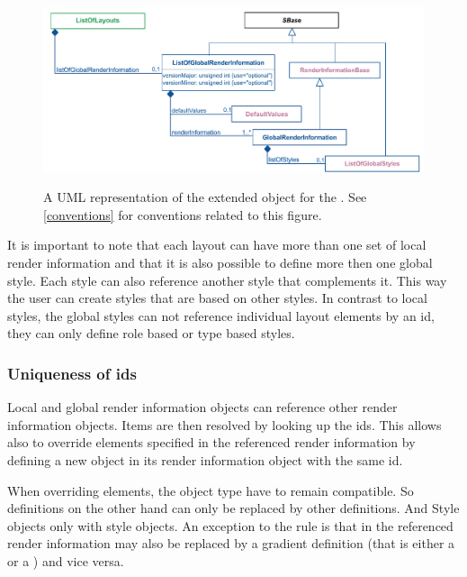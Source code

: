 \begin{figure}[!ht]
  \centering
  \includegraphics[width=\textwidth]{images/render-listoflayout-uml}\\
  \caption{A UML representation of the extended \ListOfLayouts object for the \RenderPackage.  See \ref{conventions} for conventions related to this figure. }
  \label{fig:lol_render_uml}
\end{figure}

It is important to note that each layout can have more than one 
set of local render information and that it is 
also possible to define more then one global style. Each style can also 
reference another style that complements it. This way the user can create 
styles that are based on other styles. In contrast to local styles, the global styles can not 
reference individual layout elements by an id, they can only define role based or 
type based styles.

\subsubsection{Uniqueness of ids}
\label{unique-id}

Local and global render information objects can reference other render 
information objects. Items are then resolved by looking up the ids. This allows 
also to override elements specified in the referenced render information by 
defining a new object in its render information object with the same id. 

When overriding elements, the object type have to remain compatible. So 
\LineEnding definitions on the other hand can only be replaced by other 
\LineEnding definitions. And Style objects only with style objects. An exception 
to the rule is that \ColorDefinitions in the referenced render information may 
also be replaced by a gradient definition (that is either a \LinearGradient or 
a \RadialGradient) and vice versa. 

